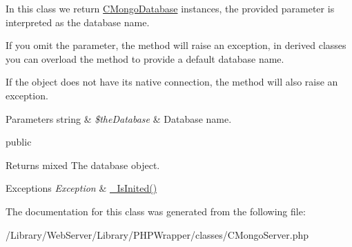 In this class we return \hyperlink{class_c_mongo_database}{C\-Mongo\-Database} instances, the provided parameter is interpreted as the database name.

If you omit the parameter, the method will raise an exception, in derived classes you can overload the method to provide a default database name.

If the object does not have its native connection, the method will also raise an exception.


\begin{DoxyParams}[1]{Parameters}
string & {\em \$the\-Database} & Database name.\\
\hline
\end{DoxyParams}
public \begin{DoxyReturn}{Returns}
mixed The database object.
\end{DoxyReturn}

\begin{DoxyExceptions}{Exceptions}
{\em Exception} & \hyperlink{class_c_status_document_a954dee06e219e0a0f2e7fa6edac56e28}{\-\_\-\-Is\-Inited()} \\
\hline
\end{DoxyExceptions}


The documentation for this class was generated from the following file\-:\begin{DoxyCompactItemize}
\item 
/\-Library/\-Web\-Server/\-Library/\-P\-H\-P\-Wrapper/classes/C\-Mongo\-Server.\-php\end{DoxyCompactItemize}
